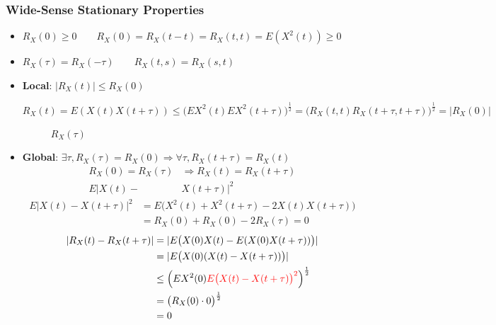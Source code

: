\documentclass[a4paper]{article}
\begin{document}
\subsubsection*{Wide-Sense Stationary Properties}
\begin{itemize}
  \item $R_X(0)\geq 0\qquad R_X(0)=R_X(t-t)=R_X(t,t)=E(X^2(t))\geq 0$
  \item $R_X(\tau)=R_X(-\tau)\qquad R_X(t,s)=R_X(s,t)$
  \item \textbf{Local}: $|R_X(t)|\leq R_X(0)$

    $$R_X(t)=E(X(t)X(t+\tau))\leq \bigl(EX^2(t)EX^2(t+\tau)\bigr)^{\frac 12}=\bigl(R_X(t,t)R_X(t+\tau, t+\tau)\bigr)^{\frac 12}=|R_X(0)|$$

\begin{figure}[H]
\centering
{}
\caption{$R_X(\tau)$}
\end{figure}
\item \textbf{Global}: $\exists\tau, R_X(\tau)=R_X(0)\Rightarrow \forall \tau, R_X(t + \tau)=R_X(t)$
  $$\begin{aligned}
    R_X(0){=}R_X(\tau)&\Longrightarrow R_X(t){=}R_X(t+\tau) \\
    E|X(t)-&X(t+\tau)|^2
\end{aligned}$$
$$\begin{aligned}
  E|X(t)-X(t+\tau)|^2&=E\bigl(X^2(t)+X^2(t+\tau)-2X(t)X(t + \tau)\bigr) \\
                     &=R_X(0) + R_X(0) - 2R_X(\tau)=0
\end{aligned}$$
$$\begin{aligned}
  |R_X(t) - R_X(t+\tau)| &= |E\bigl(X(0)X(t)-E(X(0)X(t+\tau))\bigr)|\\
                         &=|E\bigl(X(0)(X(t)-X(t+\tau))\bigr)| \\
                         &\leq\Bigl(EX^2(0){\color{red}E\bigl(X(t)-X(t+\tau)\bigr)^2}\Bigr)^{\frac 12} \\
                         &=\bigl(R_X(0)\cdot 0\bigl)^{\frac 12}\\
                         &=0
\end{aligned}$$
\end{itemize}
\end{document}
